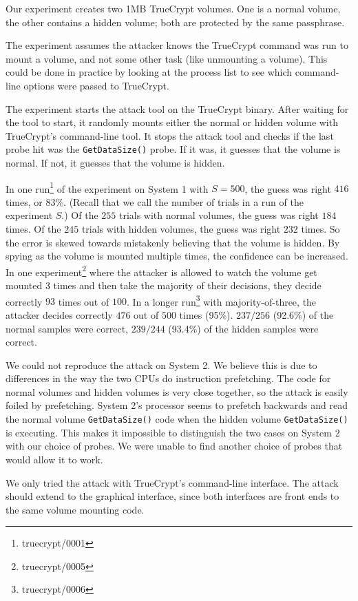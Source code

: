 \documentclass[letterpaper,twocolumn,10pt]{article}
\begin{document}
Our experiment creates two 1MB TrueCrypt volumes. One is a normal volume, the
other contains a hidden volume; both are protected by the same passphrase.

The experiment assumes the attacker knows the TrueCrypt command was run to mount
a volume, and not some other task (like unmounting a volume). This could be done
in practice by looking at the process list to see which command-line options
were passed to TrueCrypt.

The experiment starts the attack tool on the TrueCrypt binary. After waiting for
the tool to start, it randomly mounts either the normal or hidden volume with
TrueCrypt's command-line tool. It stops the attack tool and checks if the last
probe hit was the \texttt{GetDataSize()} probe. If it was, it guesses that the
volume is normal. If not, it guesses that the volume is hidden.

In one run\footnote{truecrypt/0001} of the experiment on System 1 with $S=500$,
the guess was right $416$ times, or 83\%.
(Recall that we call the
number of trials in a run of the experiment $S$.)
Of the $255$ trials with
normal volumes, the guess was right $184$ times. Of the $245$ trials with hidden
volumes, the guess was right $232$ times. So the error is skewed towards
mistakenly believing that the volume is hidden. By spying as the volume is
mounted multiple times, the confidence can be increased. In one
experiment\footnote{truecrypt/0005} where the attacker is allowed to watch the
volume get mounted 3 times and then take the majority of their decisions, they
decide correctly $93$ times out of $100$. In a longer
run\footnote{truecrypt/0006} with majority-of-three, the attacker decides
correctly $476$ out of $500$ times (95\%). $237/256$ (92.6\%) of the normal
samples were correct, $239/244$ (93.4\%) of the hidden samples were correct.

We could not reproduce the attack on System 2. We believe this is due to
differences in the way the two CPUs do instruction prefetching. The code for
normal volumes and hidden volumes is very close together, so the attack is
easily foiled by prefetching. System 2's processor seems to prefetch backwards
and read the normal volume \texttt{GetDataSize()} code when the hidden volume
\texttt{GetDataSize()} is executing. This makes it impossible to distinguish the
two cases on System 2 with our choice of probes. We were unable to find another
choice of probes that would allow it to work.

We only tried the attack with TrueCrypt's command-line interface. The attack
should extend to the graphical interface, since both interfaces are front ends
to the same volume mounting code. 
\end{document}
